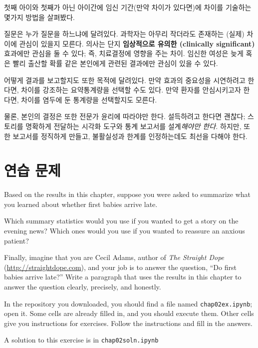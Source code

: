 첫째 아이와 첫째가 아닌 아이간에 임신 기간(만약 차이가 있다면)에 
차이를 기술하는 몇가지 방법을 살펴봤다.

질문은 누가 질문을 하느냐에 달려있다. 과학자는 아무리 작더라도 존재하는 (실제) 차이에 관심이 있을지 모른다. 의사는 단지 {\bf 임상적으로 유의한 (clinically significant)} 효과에만 관심을 둘 수 있다; 즉, 치료결정에 영향을 주는 차이. 임신한 여성은 늦게 혹은 빨리 출산할 확률 같은 본인에게 관련된 결과에만 관심이 있을 수 있다. 


어떻게 결과를 보고할지도 또한 목적에 달려있다. 만약 효과의 중요성을 시연하려고 한다면,
차이를 강조하는 요약통계량을 선택할 수도 있다. 만약 환자를 안심시키고자 한다면, 차이를 염두에 둔 통계량을 선택할지도 모른다. 

물론, 본인의 결정은 또한 전문가 윤리에 따라야만 한다. 설득하려고 한다면 괜찮다; 
스토리를 명확하게 전달하는 시각화 도구와 통계 보고서를 설계{\em 해야만 한다.}
하지만, 또한 보고서를 정직하게 만들고, 불활실성과 한계를 인정하는데도 최선을 다해야 한다.



\section{연습 문제}

\begin{exercise}
Based on the results in this chapter, suppose you were asked to
summarize what you learned about whether first babies arrive late.

Which summary statistics would you use if you wanted to get a story
on the evening news?  Which ones would you use if you wanted to
reassure an anxious patient?

Finally, imagine that you are Cecil Adams, author of {\it The Straight
  Dope} (\url{http://straightdope.com}), and your job is to answer the
question, ``Do first babies arrive late?''  Write a paragraph that
uses the results in this chapter to answer the question clearly,
precisely, and honestly.

\end{exercise}

\begin{exercise}
In the repository you downloaded, you should find a file named
\verb"chap02ex.ipynb"; open it.  Some cells are already filled in, and
you should execute them.  Other cells give you instructions for
exercises.  Follow the instructions and fill in the answers.

A solution to this exercise is in \verb"chap02soln.ipynb"
\end{exercise}

